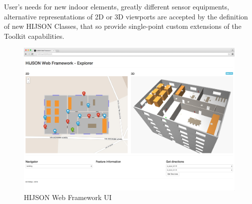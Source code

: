 User's needs for new indoor elements, greatly different sensor equipments,
alternative representations of 2D or 3D viewports are accepted by the
definition of new HIJSON Classes, that so provide single-point
custom extensions of the Toolkit capabilities.


\begin{figure}[htb]
\centering
\includegraphics[width=\textwidth]{images/web_framework_2.png}
\caption{HIJSON Web Framework UI}
\label{fig:web-framework-ui}
\end{figure}
